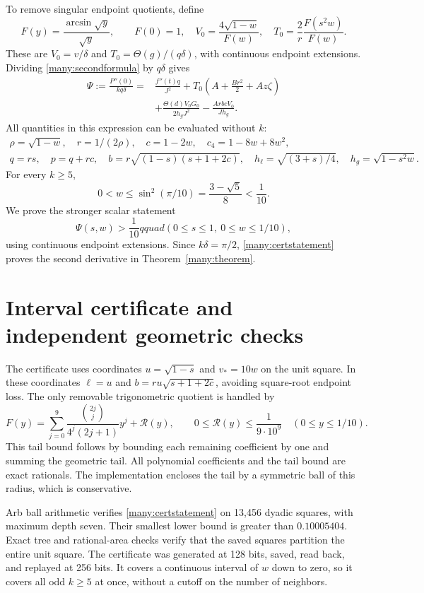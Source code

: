\documentclass[11pt]{article}
\theoremstyle{remark}\newtheorem{remark}[theorem]{Remark}
\newcommand{\Th}{\Theta}
\begin{document}
To remove singular endpoint quotients, define
\[
 F(y)=\frac{\arcsin\sqrt y}{\sqrt y},\qquad F(0)=1,
 \quad V_0=\frac{4\sqrt{1-w}}{F(w)},\quad
 T_0=\frac2r\frac{F(s^2w)}{F(w)}.
\]
These are $V_0=v/\delta$ and $T_0=\Th(g)/(q\delta)$, with
continuous endpoint extensions. Dividing \eqref{many:secondformula}
by $q\delta$ gives
\begin{equation}\label{many:psi}
 \begin{split}
 \Psi:=\frac{P''(0)}{kq\delta}
 ={}&\frac{f''(t)q}{J^2}
 +T_0\left(A+\frac{Br^2}{2}+Az\zeta\right)\\
 &+\frac{\Th(d)V_0G_0}{2h_gJ^2}
 -\frac{ArbcV_0}{Jh_g}.
 \end{split}
\end{equation}
All quantities in this expression can be evaluated without $k$:
\begin{gather*}
 \rho=\sqrt{1-w},\quad r=1/(2\rho),\quad
 c=1-2w,\quad c_4=1-8w+8w^2,\\
 q=rs,\quad p=q+rc,\quad
 b=r\sqrt{(1-s)(s+1+2c)},\quad
 h_\ell=\sqrt{(3+s)/4},\quad h_g=\sqrt{1-s^2w}.
\end{gather*}
For every $k\geq5$,
\[
 0<w\leq\sin^2(\pi/10)=\frac{3-\sqrt5}{8}<\frac1{10}.
\]
We prove the stronger scalar statement
\begin{equation}\label{many:certstatement}
 \Psi(s,w)>\frac1{10}qquad
 (0\leq s\leq1,\ 0\leq w\leq1/10),
\end{equation}
using continuous endpoint extensions. Since $k\delta=\pi/2$,
\eqref{many:certstatement} proves the second derivative in
Theorem~\ref{many:theorem}.

\section{Interval certificate and independent geometric checks}
The certificate uses coordinates $u=\sqrt{1-s}$ and $v_*=10w$ on
the unit square. In these coordinates $\ell=u$ and
$b=ru\sqrt{s+1+2c}$, avoiding square-root endpoint loss.
The only removable trigonometric quotient is handled by
\[
 F(y)=\sum_{j=0}^{9}
 \frac{\binom{2j}{j}}{4^j(2j+1)}y^j+\mathcal R(y),
 \qquad 0\leq\mathcal R(y)\leq\frac1{9\cdot10^9}
 \quad(0\leq y\leq1/10).
\]
This tail bound follows by bounding each remaining coefficient by
one and summing the geometric tail. All polynomial coefficients
and the tail bound are exact rationals. The implementation encloses
the tail by a symmetric ball of this radius, which is conservative.

Arb ball arithmetic verifies \eqref{many:certstatement} on 13,456 dyadic
squares, with maximum depth seven. Their smallest lower bound is
greater than $0.10005404$. Exact tree and rational-area checks
verify that the saved squares partition the entire unit square.
The certificate was generated at 128 bits, saved, read back, and
replayed at 256 bits. It covers a continuous interval of $w$ down
to zero, so it covers all odd $k\geq5$ at once, without a cutoff
on the number of neighbors.
\end{document}
